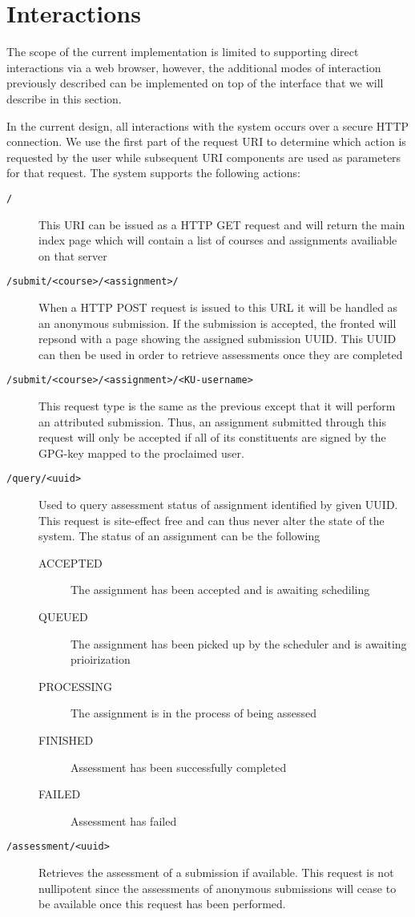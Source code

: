 \section{Interactions}
The scope of the current implementation is limited to supporting
direct interactions via a web browser, however, the additional modes
of interaction previously described can be implemented on top of the
interface that we will describe in this section.

In the current design, all interactions with the system occurs over a
secure HTTP connection. We use the first part of the request URI to
determine which action is requested by the user while subsequent URI
components are used as parameters for that request. The system
supports the following actions:

\begin{description}

\item[\texttt{/}] This URI can be issued as a HTTP GET request and
  will return the main index page which will contain a list of courses
  and assignments availiable on that server
\item[\texttt{/submit/<course>/<assignment>/}] When a HTTP POST
    request is issued to this URL it will be handled as an anonymous
    submission. If the submission is accepted, the fronted will
    repsond with a page showing the assigned submission UUID. This
    UUID can then be used in order to retrieve assessments once they
    are completed
\item[\texttt{/submit/<course>/<assignment>/<KU-username>}] This
  request type is the same as the previous except that it will perform
  an attributed submission. Thus, an assignment submitted through this
  request will only be accepted if all of its constituents are signed
  by the GPG-key mapped to the proclaimed user.

\item[\texttt{/query/<uuid>}] Used to query assessment status of
  assignment identified by given UUID. This request is site-effect free and
  can thus never alter the state of the system. The status of an assignment can
  be the following
  \begin{description}
    \item[ACCEPTED] The assignment has been accepted and is
      awaiting schediling
    \item[QUEUED] The assignment has been picked up by the
      scheduler and is awaiting prioirization
    \item[PROCESSING] The assignment is in the process of being assessed
    \item[FINISHED] Assessment has been successfully completed
    \item[FAILED] Assessment has failed
  \end{description}
\item[\texttt{/assessment/<uuid>}] Retrieves the assessment of a
  submission if available. This request is not nullipotent since the
  assessments of anonymous submissions will cease to be available once
  this request has been performed.
\end{description}

